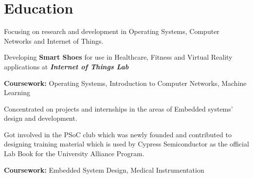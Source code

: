 \documentclass[letterpaper]{deedy-resume} %
\begin{document}
\begin{minipage}[t]{1.0\textwidth} %


\section{Education}
\vspace{\topsep} %
\begin{tightitemize}
\item Focusing on research and development in Operating Systems, Computer Networks and Internet of Things.
\item Developing \textbf{Smart Shoes} for use in Healthcare, Fitness and Virtual Reality applications at \textbf{\textit{Internet of Things Lab}}
\item \textbf{Coursework:} Operating Systems, Introduction to Computer Networks, Machine Learning
\end{tightitemize}

\sectionspace %

\begin{tightitemize}
\item Concentrated on projects and internships in the areas of Embedded systems' design and development.
\item Got involved in the PSoC club which was newly founded and contributed to designing training material which is used by Cypress Semiconductor as the official Lab Book for the University Alliance Program.
\item \textbf{Coursework:} Embedded System Design, Medical Instrumentation
\end{tightitemize}





\end{minipage}
\end{document}
